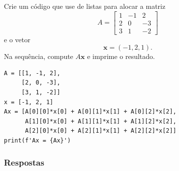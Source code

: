 \begin{exer}
  Crie um código que use de listas para alocar a matriz
  \begin{equation}
    A =
    \begin{bmatrix}
      1 & -1 & 2\\
      2 & 0 & -3\\
      3 & 1 & -2
    \end{bmatrix}
  \end{equation}
  e o vetor
  \begin{equation}
    \pmb{x} = (-1, 2, 1).
  \end{equation}
  Na sequência, compute $A\pmb{x}$ e imprime o resultado.
\end{exer}
\begin{resp}

\begin{lstlisting}
A = [[1, -1, 2],
     [2, 0, -3],
     [3, 1, -2]]
x = [-1, 2, 1]
Ax = [A[0][0]*x[0] + A[0][1]*x[1] + A[0][2]*x[2],
      A[1][0]*x[0] + A[1][1]*x[1] + A[1][2]*x[2],
      A[2][0]*x[0] + A[2][1]*x[1] + A[2][2]*x[2]]
print(f'Ax = {Ax}')
\end{lstlisting}

\end{resp}

\ifisbook
\subsubsection{Respostas}
\shipoutAnswer
\fi